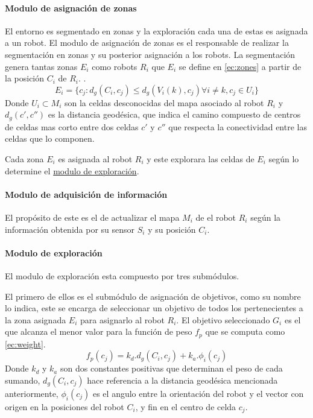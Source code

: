 \paragraph{Modulo de asignación de zonas }
El entorno es segmentado en zonas y la exploración cada una de estas es asignada a un robot. El modulo de asignación de zonas es el responsable de realizar la segmentación en zonas y su posterior asignación a los robots. La segmentación genera tantas zonas $E_i$ como robots $R_i$ que $E_i$ se define en \eqref{ec:zones} a partir de la posición $C_i$ de $R_i$. .
\begin{equation}\label{ec:zones}
  E_i=\{c_j:d_g(C_i,c_j)\leq d_g(V_i(k),c_j) \forall i \neq k , c_j \in U_i\}
\end{equation}
Donde $U_i \subset M_i$ son la celdas desconocidas del mapa asociado al robot $R_i$ y $d_g(c',c'')$ es la distancia geodésica, que indica el camino compuesto de centros de celdas mas corto entre dos celdas $c'$ y $c''$ que respecta la conectividad entre las celdas que lo componen.

Cada zona $E_i$ es asignada al robot $R_i$ y este explorara las celdas de $E_i$ según lo determine el \hyperref[par:estar:moduloexp]{modulo de exploración}.

\paragraph{Modulo de adquisición de información}
El propósito de este es el de actualizar el mapa $M_i$ de el robot $R_i$ según la información obtenida por su sensor $S_i$ y su posición $C_i$.

\paragraph{Modulo de exploración}\label{par:estar:moduloexp}
El modulo de exploración esta compuesto por tres submódulos. 

El primero de ellos es el submódulo de asignación de objetivos, como su nombre lo indica, este se encarga de seleccionar un objetivo de todos los pertenecientes a la zona asignada $E_i$ para asignarlo al robot $R_i$. El objetivo seleccionado $G_i$ es el que alcanza el menor valor para la función de peso $f_p$ que se computa como \eqref{ec:weight}.
\begin{equation}\label{ec:weight}
  f_p(c_j) = k_d.d_g(C_i,c_j) + k_a.\phi_i(c_j)
\end{equation}
Donde $k_d$ y $k_a$ son dos constantes positivas que determinan el peso de cada sumando, $d_g(C_i,c_j)$ hace referencia a la distancia geodésica mencionada anteriormente, $\phi_i(c_j)$ es el angulo entre la orientación del robot y el vector con origen en la posiciones del robot $C_i$, y fin en el centro de celda $c_j$. 

